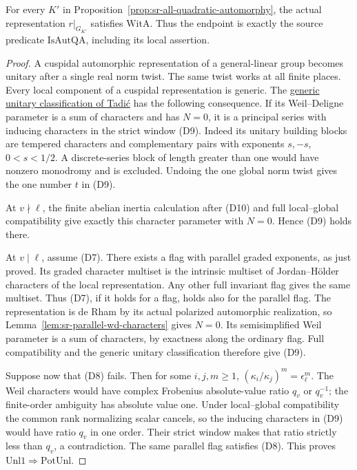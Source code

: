 \begin{srproposition}\label{prop:sr-actual-wit}
For every \(K'\) in Proposition~\ref{prop:sr-all-quadratic-automorphy},
the actual representation \(r|_{G_{K'}}\) satisfies
\(\mathrm{WitA}\).
Thus the endpoint is exactly the source predicate
\(\mathrm{IsAutQA}\), including its local assertion.
\end{srproposition}
\begin{proof}
A cuspidal automorphic representation of a general-linear
group becomes unitary after a single real norm twist.
The same twist works at all finite places.
Every local component of a cuspidal representation is
generic. The
\href{https://www.numdam.org/item/ASENS_1986_4_19_3_335_0/}
{generic unitary classification of Tadi\'c}
has the following consequence.
If its Weil--Deligne parameter is a sum of characters
and has \(N=0\), it is a principal series with inducing
characters in the strict window (D9).
Indeed its unitary building blocks are tempered
characters and complementary pairs with exponents
\(s,-s\), \(0<s<1/2\).
A discrete-series block of length greater than one
would have nonzero monodromy and is excluded.
Undoing the one global norm twist gives the one
number \(t\) in (D9).

At \(v\nmid\ell\), the finite abelian inertia calculation
after (D10) and full local--global compatibility give
exactly this character parameter with \(N=0\).
Hence (D9) holds there.

At \(v\mid\ell\), assume (D7).
There exists a flag with parallel graded exponents,
as just proved.
Its graded character multiset is the intrinsic multiset
of Jordan--H\"older characters of the local representation.
Any other full invariant flag gives the same multiset.
Thus (D7), if it holds for a flag, holds also for the
parallel flag.
The representation is de Rham by its actual polarized
automorphic realization, so
Lemma~\ref{lem:sr-parallel-wd-characters}
gives \(N=0\).
Its semisimplified Weil parameter is a sum of characters,
by exactness along the ordinary flag.
Full compatibility and the generic unitary classification
therefore give (D9).

Suppose now that (D8) fails.
Then for some \(i,j,m\ge1\),
\((\kappa_i/\kappa_j)^m=\epsilon_\ell^m\).
The Weil characters would have complex Frobenius
absolute-value ratio \(q_v\) or \(q_v^{-1}\);
the finite-order ambiguity has absolute value one.
Under local--global compatibility the common rank
normalizing scalar cancels, so the inducing characters
in (D9) would have ratio \(q_v\) in one order.
Their strict window makes that ratio strictly less
than \(q_v\), a contradiction.
The same parallel flag satisfies (D8).
This proves \(\mathrm{Unl1}\Rightarrow\mathrm{PotUnl}\).


\end{proof}
